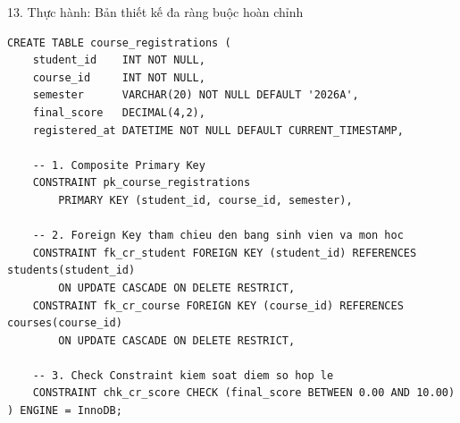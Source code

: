 \documentclass[aspectratio=169,11pt]{beamer}
\begin{document}
\begin{frame}[fragile]{13. Thực hành: Bản thiết kế đa ràng buộc hoàn chỉnh}
\begin{lstlisting}
CREATE TABLE course_registrations (
    student_id    INT NOT NULL,
    course_id     INT NOT NULL,
    semester      VARCHAR(20) NOT NULL DEFAULT '2026A',
    final_score   DECIMAL(4,2),
    registered_at DATETIME NOT NULL DEFAULT CURRENT_TIMESTAMP,
    
    -- 1. Composite Primary Key
    CONSTRAINT pk_course_registrations 
        PRIMARY KEY (student_id, course_id, semester),
        
    -- 2. Foreign Key tham chieu den bang sinh vien va mon hoc
    CONSTRAINT fk_cr_student FOREIGN KEY (student_id) REFERENCES students(student_id)
        ON UPDATE CASCADE ON DELETE RESTRICT,
    CONSTRAINT fk_cr_course FOREIGN KEY (course_id) REFERENCES courses(course_id)
        ON UPDATE CASCADE ON DELETE RESTRICT,
        
    -- 3. Check Constraint kiem soat diem so hop le
    CONSTRAINT chk_cr_score CHECK (final_score BETWEEN 0.00 AND 10.00)
) ENGINE = InnoDB;
\end{lstlisting}
\end{frame}
\end{document}
